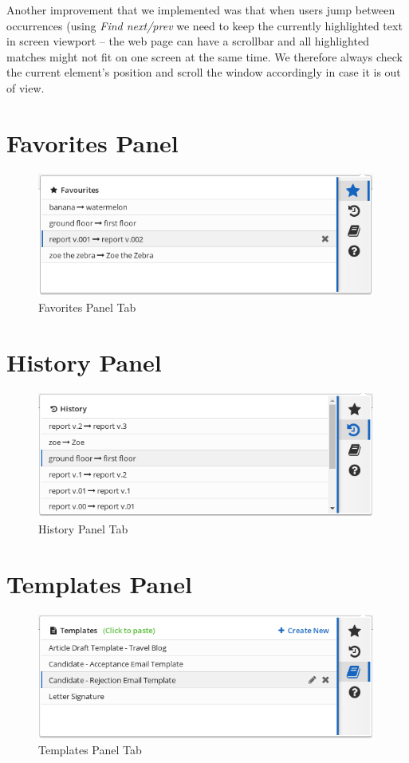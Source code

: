 \documentclass[bsc,frontabs,twoside,singlespacing,parskip,deptreport]{infthesis}
\begin{document}
Another improvement that we implemented was that when users jump between occurrences (using \textit{Find next/prev} we need to keep the currently highlighted text in screen viewport -- the web page can have a scrollbar and all highlighted matches might not fit on one screen at the same time. We therefore always check the current element's position and scroll the window accordingly in case it is out of view.

\section{Favorites Panel}
\begin{figure}[h]
\centering
\includegraphics[width=0.99\textwidth]{../main/images/help/fav-step-3.png}
\caption{Favorites Panel Tab}
\end{figure}

\section{History Panel}
\begin{figure}[h]
\centering
\includegraphics[width=0.99\textwidth]{../main/images/help/history.png}
\caption{History Panel Tab}
\end{figure}

\section{Templates Panel}
\begin{figure}[h]
\centering
\includegraphics[width=0.99\textwidth]{../main/images/help/templates.png}
\caption{Templates Panel Tab}
\end{figure}
\end{document}
